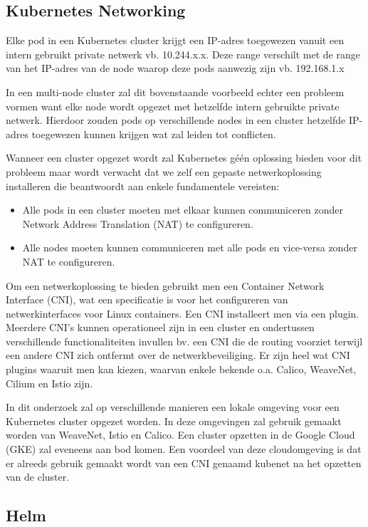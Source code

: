 \subsection{Kubernetes Networking}

Elke pod in een Kubernetes cluster krijgt een IP-adres toegewezen vanuit een intern gebruikt private netwerk vb. 10.244.x.x. 
Deze range verschilt met de range van het IP-adres van de node waarop deze pods aanwezig zijn vb. 192.168.1.x

In een multi-node cluster zal dit bovenstaande voorbeeld echter een probleem vormen want elke node wordt opgezet met hetzelfde intern gebruikte private netwerk. Hierdoor zouden pods op verschillende nodes in een cluster hetzelfde IP-adres toegewezen kunnen krijgen wat zal leiden tot conflicten.

Wanneer een cluster opgezet wordt zal Kubernetes géén oplossing bieden voor dit probleem maar wordt verwacht dat we zelf een gepaste netwerkoplossing installeren die beantwoordt aan enkele fundamentele vereisten: 
\begin{itemize}
    \item Alle pods in een cluster moeten met elkaar kunnen communiceren zonder Network Address Translation (NAT) te configureren.
    \item Alle nodes moeten kunnen communiceren met alle pods en vice-versa zonder NAT te configureren.
\end{itemize} 

Om een netwerkoplossing te bieden gebruikt men een Container Network Interface (CNI), wat een specificatie is voor het configureren van netwerkinterfaces voor Linux containers. Een CNI installeert men via een plugin. Meerdere CNI's kunnen operationeel zijn in een cluster en ondertussen verschillende functionaliteiten invullen bv. een CNI die de routing voorziet terwijl een andere CNI zich ontfermt over de netwerkbeveiliging. Er zijn heel wat CNI plugins waaruit men kan kiezen, waarvan enkele bekende o.a. Calico, WeaveNet, Cilium en Istio zijn. \autocite{Power2019}

In dit onderzoek zal op verschillende manieren een lokale omgeving voor een Kubernetes cluster opgezet worden. In deze omgevingen zal gebruik gemaakt worden van WeaveNet, Istio en Calico. Een cluster opzetten in de Google Cloud (GKE) zal eveneens aan bod komen. Een voordeel van deze cloudomgeving is dat er alreeds gebruik gemaakt wordt van een CNI genaamd kubenet na het opzetten van de cluster.    
 
\subsection{Helm}

